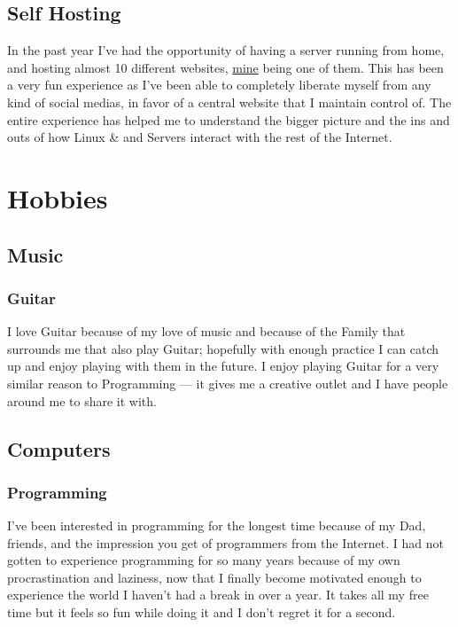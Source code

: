 \documentclass{article}
\begin{document}
\subsection{Self Hosting}

In the past year I've had the opportunity of having a server running from home, and hosting almost 10 different websites, \href{http://www.williamdeprez.xyz}{mine} being one of them. This has been a very fun experience as I've been able to completely liberate myself from any kind of social medias, in favor of a central website that I maintain control of. The entire experience has helped me to understand the bigger picture and the ins and outs of how Linux \& and Servers interact with the rest of the Internet.

\section{Hobbies}

\subsection{Music}

\subsubsection{Guitar}

I love Guitar because of my love of music and because of the Family that surrounds me that also play Guitar; hopefully with enough practice I can catch up and enjoy playing with them in the future. I enjoy playing Guitar for a very similar reason to Programming --- it gives me a creative outlet and I have people around me to share it with.

\subsection{Computers}

\subsubsection{Programming}

I've been interested in programming for the longest time because of my Dad, friends, and the impression you get of programmers from the Internet. I had not gotten to experience programming for so many years because of my own procrastination and laziness, now that I finally become motivated enough to experience the world I haven't had a break in over a year. It takes all my free time but it feels so fun while doing it and I don't regret it for a second.
\end{document}
